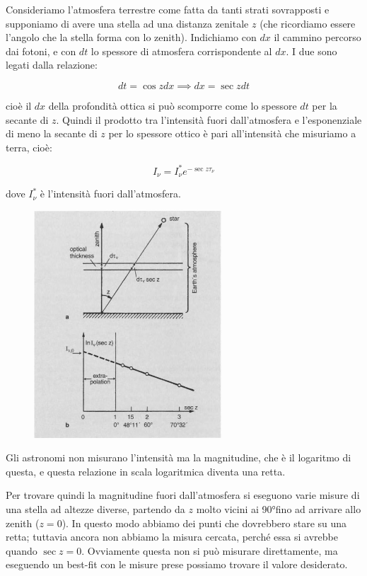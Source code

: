 Consideriamo l'atmosfera terrestre come fatta da tanti strati sovrapposti e supponiamo di avere una stella ad una distanza zenitale $z$ (che ricordiamo essere l'angolo che la stella forma con lo zenith). Indichiamo con $dx$ il cammino percorso dai fotoni, e con $dt$ lo spessore di atmosfera corrispondente al $dx$. I due sono legati dalla relazione:

$$dt=\cos{z} dx \implies dx=\sec{z} dt $$

cioè il $dx$ della profondità ottica si può scomporre come lo spessore $dt$ per la secante di $z$. Quindi il prodotto tra l'intensità fuori dall'atmosfera e l'esponenziale di meno la secante di $z$ per lo spessore ottico è pari all'intensità che misuriamo a terra, cioè:

\begin{equation}
   I_{\nu}=I_{\nu}^* e^{-\sec{z} \tau_{\nu}}
\end{equation}

dove $I_{\nu}^*$ è l'intensità fuori dall'atmosfera.

\begin{minipage}{0.495\textwidth}
   \begin{figure}[H]
      \centering
      \includegraphics[width=7cm]{immagini/retta_luminosita.png}
   \end{figure}
\end{minipage}
\begin{minipage}{0.495\textwidth}
   \vspace{0.2cm}Gli astronomi non misurano l'intensità ma la magnitudine, che è il logaritmo di questa, e questa relazione in scala logaritmica diventa una retta.
   
   Per trovare quindi la magnitudine fuori dall'atmosfera si eseguono varie misure di una stella ad altezze diverse, partendo da $z$ molto vicini ai 90°\footnotemark fino ad arrivare allo zenith ($z=0$). In questo modo abbiamo dei punti che dovrebbero stare su una retta; tuttavia ancora non abbiamo la misura cercata, perché essa si avrebbe quando $\sec{z}=0$\footnotemark. Ovviamente questa non si può misurare direttamente, ma eseguendo un best-fit con le misure prese possiamo trovare il valore desiderato.
\end{minipage}

